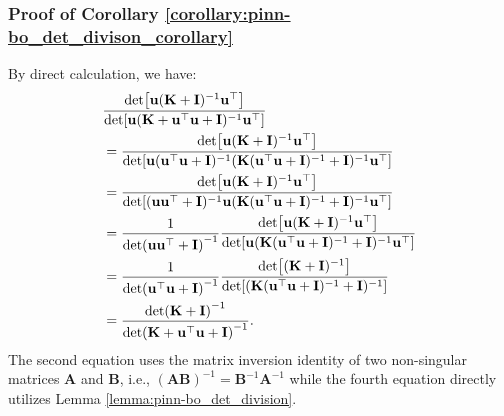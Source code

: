 \subsubsection{Proof of Corollary \ref{corollary:pinn-bo_det_divison_corollary}}
By direct calculation, we have:
\begin{align*}
    & \frac{\det[\mathbf{u}(\mathbf{K}+\mathbf{I})^{-1} \mathbf{u}^\top]}{\det [\mathbf{u}(\mathbf{K}+ \mathbf{u}^\top \mathbf{u} + \mathbf{I})^{-1} \mathbf{u}^\top]} \notag
\\
    &= \frac{\det[\mathbf{u}(\mathbf{K}+\mathbf{I})^{-1} \mathbf{u}^\top]}{\det [\mathbf{u} (\mathbf{u}^\top \mathbf{u}+\mathbf{I})^{-1}(\mathbf{K} (\mathbf{u}^\top \mathbf{u} + \mathbf{I})^{-1} + \mathbf{I})^{-1} \mathbf{u}^\top]}
\\
    &=\frac{\det[\mathbf{u}(\mathbf{K}+\mathbf{I})^{-1} \mathbf{u}^\top]}{\det [ (\mathbf{u} \mathbf{u}^\top+\mathbf{I})^{-1}\mathbf{u} (\mathbf{K} (\mathbf{u}^\top \mathbf{u} + \mathbf{I})^{-1} + \mathbf{I})^{-1} \mathbf{u}^\top]}
\\
    &= \frac{1}{\det (\mathbf{u} \mathbf{u}^\top+\mathbf{I})^{-1}} \frac{\det[\mathbf{u}(\mathbf{K}+\mathbf{I})^{-1} \mathbf{u}^\top]}{\det [\mathbf{u} (\mathbf{K} (\mathbf{u}^\top \mathbf{u} + \mathbf{I})^{-1} + \mathbf{I})^{-1} \mathbf{u}^\top]}
\\
    &=\frac{1}{\det (\mathbf{u} ^\top \mathbf{u}+\mathbf{I})^{-1}} \frac{\det[(\mathbf{K}+\mathbf{I})^{-1}]}{\det [ (\mathbf{K} (\mathbf{u}^\top \mathbf{u} + \mathbf{I})^{-1} + \mathbf{I})^{-1}]}
\\
    &= \frac{\det (\mathbf{K}+\mathbf{I})^{-1}}{\det(\mathbf{K}+\mathbf{u}^\top \mathbf{u}+\mathbf{I})^{-1}}.
\end{align*}
The second equation uses the matrix inversion identity of two non-singular matrices $\mathbf{A}$ and $\mathbf{B}$, i.e., $(\mathbf{A}\mathbf{B})^{-1} = \mathbf{B}^{-1} \mathbf{A}^{-1}$ while the fourth equation directly utilizes Lemma \ref{lemma:pinn-bo_det_division}.
